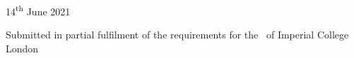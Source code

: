 \begin{titlepage}



{\large 14\textsuperscript{th} June 2021} %


\vfill %
Submitted in partial fulfilment of the requirements for the \degreetype~of Imperial College London

\end{titlepage}

